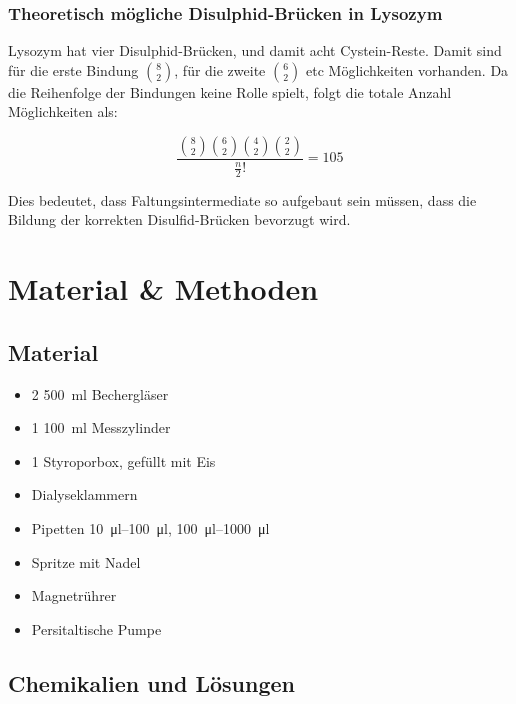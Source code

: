 \documentclass[a4paper,german]{scrreprt}
\begin{document}
\subsection{Theoretisch mögliche Disulphid-Brücken in Lysozym}

Lysozym hat vier Disulphid-Brücken, und damit acht Cystein-Reste. Damit sind
für die erste Bindung $\binom{8}{2}$, für die zweite $\binom{6}{2}$ etc
Möglichkeiten vorhanden. Da die Reihenfolge der Bindungen keine Rolle spielt,
folgt die totale Anzahl Möglichkeiten als:

\[
	\frac{\binom{8}{2} \binom{6}{2} \binom{4}{2} \binom{2}{2}}{\frac{n}{2}!} = 105
\]

Dies bedeutet, dass Faltungsintermediate so aufgebaut sein müssen, dass die
Bildung der korrekten Disulfid-Brücken bevorzugt wird.

\chapter{Material \& Methoden}

\section{Material}

\begin{itemize}
\item 2 \SI{500}{ml} Bechergläser
\item 1 \SI{100}{ml} Messzylinder
\item 1 Styroporbox, gefüllt mit Eis
\item Dialyseklammern
\item Pipetten \SIrange{10}{100}{\ul}, \SIrange{100}{1000}{\ul}
\item Spritze mit Nadel
\item Magnetrührer
\item Persitaltische Pumpe
\end{itemize}

\section{Chemikalien und Lösungen}
\end{document}

